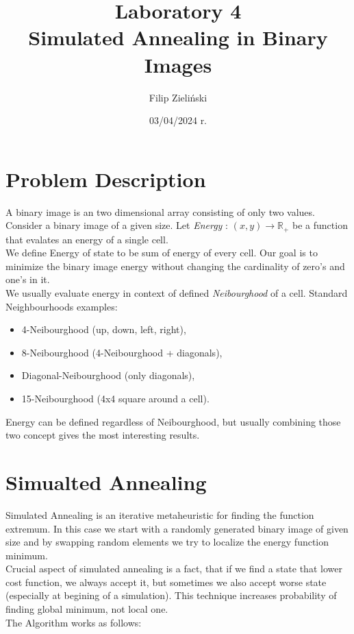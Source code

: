 \documentclass{article}
\title{%
Laboratory 4\\
  \huge Simulated Annealing in Binary Images}
\author{Filip Zieliński}
\date{03/04/2024 r.}
\begin{document}
\maketitle


\section*{Problem Description}
A binary image is an two dimensional array consisting of only two values.
\\
Consider a binary image of a given size.  Let \textit{Energy} : $ (x,y) \rightarrow \mathbb{R}_+ $ be a function that evalates an energy of a single cell.
\\
We define Energy of state to be sum of energy of every cell. Our goal is to minimize the binary image energy without changing the cardinality of zero's and one's in it.
\\
We usually evaluate energy in context of defined \textit{Neibourghood} of a cell. Standard Neighbourhoods examples:
\begin{itemize}
    \item 4-Neibourghood (up, down, left, right), 
    \item 8-Neibourghood (4-Neibourghood + diagonals),
    \item Diagonal-Neibourghood (only diagonals),
    \item 15-Neibourghood (4x4 square around a cell).
\end{itemize}
Energy can be defined regardless of Neibourghood, but usually combining those two concept gives the most interesting results.
\section*{Simualted Annealing}
Simulated Annealing is an iterative metaheuristic for finding the function extremum. In this case we start with a randomly generated binary image of
given size and by swapping random elements we try to localize the energy function minimum. 
\\
Crucial aspect of simulated annealing is a fact, that if we find a state that lower cost function, we always accept it, but sometimes we also accept 
worse state (especially at begining of a simulation). This technique increases probability of finding  global minimum, not local one.
\\
The Algorithm works as follows:
\end{document}
